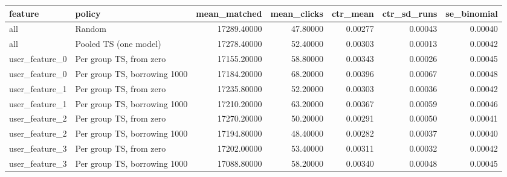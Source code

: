 \begin{tabular}{llrrrrr}
\toprule
feature & policy & mean\_matched & mean\_clicks & ctr\_mean & ctr\_sd\_runs & se\_binomial \\
\midrule
all & Random & 17289.40000 & 47.80000 & 0.00277 & 0.00043 & 0.00040 \\
all & Pooled TS (one model) & 17278.40000 & 52.40000 & 0.00303 & 0.00013 & 0.00042 \\
user\_feature\_0 & Per group TS, from zero & 17155.20000 & 58.80000 & 0.00343 & 0.00026 & 0.00045 \\
user\_feature\_0 & Per group TS, borrowing 1000 & 17184.20000 & 68.20000 & 0.00396 & 0.00067 & 0.00048 \\
user\_feature\_1 & Per group TS, from zero & 17235.80000 & 52.20000 & 0.00303 & 0.00036 & 0.00042 \\
user\_feature\_1 & Per group TS, borrowing 1000 & 17210.20000 & 63.20000 & 0.00367 & 0.00059 & 0.00046 \\
user\_feature\_2 & Per group TS, from zero & 17270.20000 & 50.20000 & 0.00291 & 0.00050 & 0.00041 \\
user\_feature\_2 & Per group TS, borrowing 1000 & 17194.80000 & 48.40000 & 0.00282 & 0.00037 & 0.00040 \\
user\_feature\_3 & Per group TS, from zero & 17202.00000 & 53.40000 & 0.00311 & 0.00032 & 0.00042 \\
user\_feature\_3 & Per group TS, borrowing 1000 & 17088.80000 & 58.20000 & 0.00340 & 0.00048 & 0.00045 \\
\bottomrule
\end{tabular}
